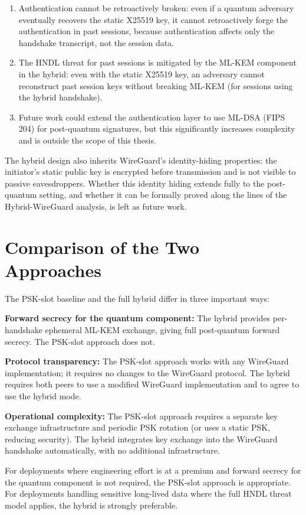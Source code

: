 \begin{enumerate}
\item Authentication cannot be retroactively broken: even if a quantum adversary eventually recovers the static X25519 key, it cannot retroactively forge the authentication in past sessions, because authentication affects only the handshake transcript, not the session data.

\item The HNDL threat for past sessions is mitigated by the ML-KEM component in the hybrid: even with the static X25519 key, an adversary cannot reconstruct past session keys without breaking ML-KEM (for sessions using the hybrid handshake).

\item Future work could extend the authentication layer to use ML-DSA (FIPS 204) for post-quantum signatures, but this significantly increases complexity and is outside the scope of this thesis.
\end{enumerate}

The hybrid design also inherits WireGuard's identity-hiding properties: the initiator's static public key is encrypted before transmission and is not visible to passive eavesdroppers. Whether this identity hiding extends fully to the post-quantum setting, and whether it can be formally proved along the lines of the Hybrid-WireGuard analysis, is left as future work.

\section{Comparison of the Two Approaches}

The PSK-slot baseline and the full hybrid differ in three important ways:

\textbf{Forward secrecy for the quantum component:} The hybrid provides per-handshake ephemeral ML-KEM exchange, giving full post-quantum forward secrecy. The PSK-slot approach does not.

\textbf{Protocol transparency:} The PSK-slot approach works with any WireGuard implementation; it requires no changes to the WireGuard protocol. The hybrid requires both peers to use a modified WireGuard implementation and to agree to use the hybrid mode.

\textbf{Operational complexity:} The PSK-slot approach requires a separate key exchange infrastructure and periodic PSK rotation (or uses a static PSK, reducing security). The hybrid integrates key exchange into the WireGuard handshake automatically, with no additional infrastructure.

For deployments where engineering effort is at a premium and forward secrecy for the quantum component is not required, the PSK-slot approach is appropriate. For deployments handling sensitive long-lived data where the full HNDL threat model applies, the hybrid is strongly preferable.

